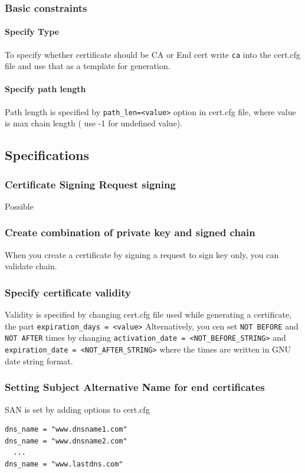 \documentclass[10pt, a4paper]{report}
\begin{document}
{  \subsubsection{Basic constraints}
    
      \paragraph{Specify Type}
To specify whether certificate should be CA or End cert write \verb+ca+ into the cert.cfg file and use that as a template for generation. 
      \paragraph{Specify path length}
Path length is specified by \verb+path_len=<value>+ option in cert.cfg file, where value is max chain length ( use -1 for undefined value).

  \subsection{Specifications}
  
    \subsubsection{Certificate Signing Request signing}
Possible %
    \subsubsection{Create combination of private key and signed chain}
When you create a certificate by signing a request to sign key only, you can validate chain. %
    \subsubsection{Specify certificate validity}
Validity is specified by changing cert.cfg file used while generating a certificate, the part \verb+expiration_days = <value>+
Alternatively, you cen set \verb+NOT BEFORE+ and \verb+NOT AFTER+ times by changing \verb+activation_date = <NOT_BEFORE_STRING>+ and \verb+expiration_date = <NOT_AFTER_STRING>+ where the times are written in GNU date string format.

    \subsubsection{Setting Subject Alternative Name for end certificates}
SAN is set by adding options to cert.cfg
\begin{verbatim}
dns_name = "www.dnsname1.com"
dns_name = "www.dnsname2.com"
  ...
dns_name = "www.lastdns.com"


\end{verbatim}}
\end{document}
